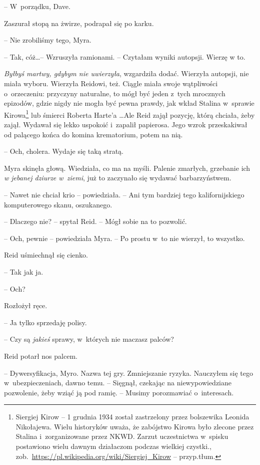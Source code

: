 \documentclass[oneside,polish,11pt,sfheadings]{mwbk}
\begin{document}
-- W~porządku, Dave.

Zaszurał stopą na żwirze, podrapał się po karku.

-- Nie zrobiliśmy tego, Myra.

-- Tak, cóż\ldots -- Wzruszyła ramionami. -- Czytałam wyniki autopsji. Wierzę
w to.

\textit{Byłbyś martwy, gdybym nie uwierzyła}, wzgardziła dodać. Wierzyła
autopsji, nie miała wyboru. Wierzyła Reidowi, też. Ciągle miała swoje
wątpliwości o~orzeczeniu: przyczyny naturalne, to mógł być jeden z~tych
mrocznych epizodów, gdzie nigdy nie mogła być pewna prawdy, jak wkład
Stalina w~sprawie Kirowa\footnote{ Siergiej Kirow -- 1 grudnia 1934 został
zastrzelony przez bolszewika Leonida Nikołajewa. Wielu historyków uważa,
że zabójstwo Kirowa było zlecone przez Stalina i~zorganizowane przez
NKWD. Zarzut uczestnictwa w~spisku postawiono wielu dawnym działaczom
podczas wielkiej czystki.,
zob.~\url{https://pl.wikipedia.org/wiki/Siergiej\_Kirow} -- przyp.tłum.} lub śmierci Roberta Harte'a \ldots Ale Reid zajął pozycję, którą
chciała, żeby zajął. Wydawał się lekko uspokoić i~zapalił papierosa.
Jego wzrok przeskakiwał od palącego końca do komina krematorium, potem
na nią.

-- Och, cholera. Wydaje się taką stratą.

Myra skinęła głową. Wiedziała, co ma na myśli. Palenie zmarłych,
grzebanie ich \textit{w jebanej dziurze w~ziemi}, już to zaczynało się
wydawać barbarzyństwem.

-- Nawet nie chciał krio -- powiedziała. -- Ani tym bardziej tego
kalifornijskiego komputerowego skanu, oszukanego.

-- Dlaczego nie? -- spytał Reid. -- Mógł sobie na to pozwolić.

-- Och, pewnie -- powiedziała Myra. -- Po prostu w~to nie wierzył, to
wszystko.

Reid uśmiechnął się cienko. 

-- Tak jak ja.

-- Och?

Rozłożył ręce. 

-- Ja tylko sprzedaję polisy.

-- Czy są \textit{jakieś} sprawy, w~których nie maczasz palców?

Reid potarł nos palcem. 

-- Dywersyfikacja, Myro. Nazwa tej gry.
Zmniejszanie ryzyka. Nauczyłem się tego w~ubezpieczeniach, dawno temu. -- Sięgnął, czekając na niewypowiedziane pozwolenie, żeby wziąć ją pod
ramię. -- Musimy porozmawiać o~interesach.
\end{document}
